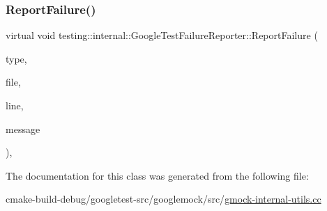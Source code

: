 \subsubsection{\texorpdfstring{ReportFailure()}{ReportFailure()}}
{\footnotesize\ttfamily virtual void testing\+::internal\+::\+Google\+Test\+Failure\+Reporter\+::\+Report\+Failure (\begin{DoxyParamCaption}\item[{\mbox{\hyperlink{gtest__environment__test_8cc_aa43ad7e2c1c5c5150ba8d95607a96263}{Failure\+Type}}}]{type,  }\item[{const char $\ast$}]{file,  }\item[{int}]{line,  }\item[{const std\+::string \&}]{message }\end{DoxyParamCaption})\hspace{0.3cm}{\ttfamily [inline]}, {\ttfamily [virtual]}}



The documentation for this class was generated from the following file\+:\begin{DoxyCompactItemize}
\item 
cmake-\/build-\/debug/googletest-\/src/googlemock/src/\mbox{\hyperlink{gmock-internal-utils_8cc}{gmock-\/internal-\/utils.\+cc}}\end{DoxyCompactItemize}

